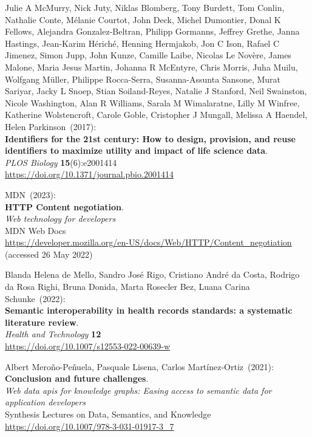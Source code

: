 \begin{thebibliography}{9}
Julie A McMurry, Nick Juty, Niklas Blomberg, Tony
Burdett, Tom Conlin, Nathalie Conte, Mélanie Courtot, John Deck, Michel
Dumontier, Donal K Fellows, Alejandra Gonzalez-Beltran, Philipp
Gormanns, Jeffrey Grethe, Janna Hastings, Jean-Karim Hériché, Henning
Hermjakob, Jon C Ison, Rafael C Jimenez, Simon Jupp, John Kunze, Camille
Laibe, Nicolas Le Novère, James Malone, Maria Jesus Martin, Johanna R
McEntyre, Chris Morris, Juha Muilu, Wolfgang Müller, Philippe
Rocca-Serra, Susanna-Assunta Sansone, Murat Sariyar, Jacky L Snoep,
Stian Soiland-Reyes, Natalie J Stanford, Neil Swainston, Nicole
Washington, Alan R Williams, Sarala M Wimalaratne, Lilly M Winfree,
Katherine Wolstencroft, Carole Goble, Cristopher J Mungall, Melissa A
Haendel, Helen Parkinson~(2017): \\
\textbf{Identifiers for the 21st century: How to design, provision, and
reuse identifiers to maximize utility and impact of life science
data}.\\
\emph{PLOS Biology} \textbf{15}(6):e2001414\\
\url{https://doi.org/10.1371/journal.pbio.2001414}

MDN~(2023): \\
\textbf{HTTP Content negotiation}.\\
\emph{Web technology for developers}\\
MDN Web Docs \\
\url{https://developer.mozilla.org/en-US/docs/Web/HTTP/Content_negotiation}
(accessed 26 May 2022)

Blanda Helena de Mello, Sandro José Rigo, Cristiano
André da Costa, Rodrigo da Rosa Righi, Bruna Donida, Marta Rosecler Bez,
Luana Carina Schunke~(2022): \\
\textbf{Semantic interoperability in health records standards: a
systematic literature review}.\\
\emph{Health and Technology} \textbf{12}\\
\url{https://doi.org/10.1007/s12553-022-00639-w}

Albert Meroño-Peñuela, Pasquale Lisena, Carlos Martínez-Ortiz~(2021):
\textbf{Conclusion and future challenges}. \\
\emph{Web data apis for knowledge graphs: {Easing} access to semantic data for application
developers} \\
Synthesis Lectures on Data, Semantics, and Knowledge\\
\url{https://doi.org/10.1007/978-3-031-01917-3_7}


\end{thebibliography}
